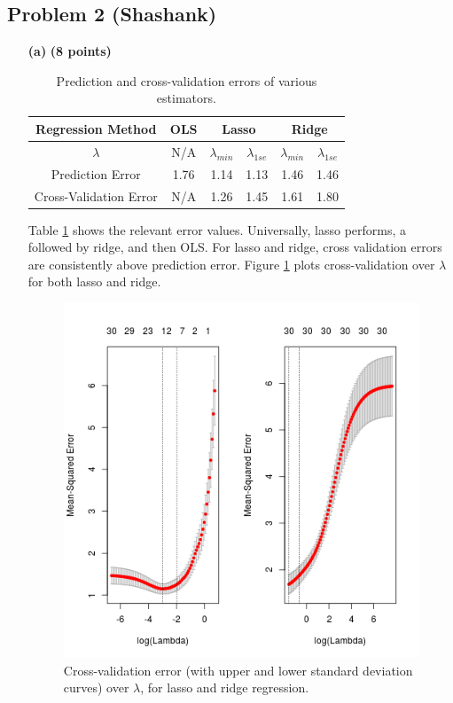 \documentclass[12pt]{article}
\newcommand{\1}{\mathbbm{1}}
\begin{document}
\subsection{Problem 2 (Shashank)}
\begin{enumerate}
\item[{\bf (a)}] {\bf (8 points)}

\begin{table}[h]
\centering
\begin{tabular}{|c|c|c|c|c|c|}
\hline
Regression Method           & OLS & \multicolumn{2}{|c|}{Lasso} & \multicolumn{2}{|c|}{Ridge} \\
\hline
$\lambda$                   & N/A & $\lambda_{min}$ & $\lambda_{1se}$ & $\lambda_{min}$ & $\lambda_{1se}$ \\
\hline
Prediction Error            & 1.76 & 1.14 & 1.13 & 1.46 & 1.46 \\
\hline
Cross-Validation Error      & N/A  & 1.26 & 1.45 & 1.61 & 1.80 \\
\hline
\end{tabular}
\caption{Prediction and cross-validation errors of various estimators.}
\label{tab:errs}
\end{table}

Table \ref{tab:errs} shows the relevant error values. Universally, lasso
performs, a followed by ridge, and then OLS. For lasso and ridge, cross
validation errors are consistently above prediction error. Figure
\ref{fig:cv_errs} plots cross-validation over $\lambda$ for both lasso and
ridge.

\begin{figure}[h!]
\centering
\includegraphics[width=0.8\linewidth]{CV_errors}
\vspace{-5mm}
\caption{Cross-validation error (with upper and lower standard deviation
curves) over $\lambda$, for lasso and ridge regression.}
\label{fig:cv_errs}
\end{figure}


\end{enumerate}
\end{document}
